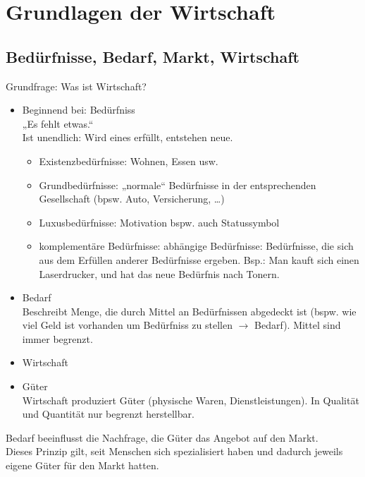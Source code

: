 \documentclass{scrreprt}
\begin{document}
\chapter{Grundlagen der Wirtschaft}
\section{Bedürfnisse, Bedarf, Markt, Wirtschaft}
Grundfrage: Was ist Wirtschaft?
\begin{itemize}
\item Beginnend bei: Bedürfniss\\
„Es fehlt etwas.“\\
Ist unendlich: Wird eines erfüllt, entstehen neue.
\begin{itemize}
\item Existenzbedürfnisse: Wohnen, Essen usw.
\item Grundbedürfnisse: „normale“ Bedürfnisse in der entsprechenden Gesellschaft (bpsw. Auto, Versicherung, …)
\item Luxusbedürfnisse: Motivation bspw. auch Statussymbol
\item komplementäre Bedürfnisse: abhängige Bedürfnisse: Bedürfnisse, die sich aus dem Erfüllen anderer Bedürfnisse ergeben. Bsp.: Man kauft sich einen Laserdrucker, und hat das neue Bedürfnis nach Tonern.
\end{itemize}
\item Bedarf\\
Beschreibt Menge, die durch Mittel an Bedürfnissen abgedeckt ist (bspw. wie viel Geld ist vorhanden um Bedürfniss zu stellen $\rightarrow$ Bedarf). Mittel sind immer begrenzt.
\item Wirtschaft
\item Güter\\
Wirtschaft produziert Güter (physische Waren, Dienstleistungen). In Qualität und Quantität nur begrenzt herstellbar.
\end{itemize}
Bedarf beeinflusst die Nachfrage, die Güter das Angebot auf den Markt.\\
Dieses Prinzip gilt, seit Menschen sich spezialisiert haben und dadurch jeweils eigene Güter für den Markt hatten.
\end{document}
